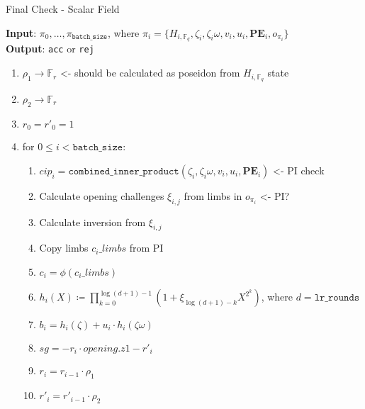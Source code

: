 \begin{algorithm}[H]
    \caption{Final Check - Scalar Field}
    \textbf{Input}: $\pi_0, \dots, \pi_{\texttt{batch\_size}}$, where $\pi_i = \{H_{i, \mathbb{F}_q}, \zeta_i, \zeta_i\omega, v_i, u_i,
    \textbf{PE}_i, o_{\pi_i} \}$ \\
    \textbf{Output}: \texttt{acc} or \texttt{rej}
    \begin{enumerate}
        \item $\rho_1 \rightarrow \mathbb{F}_r$ <- should be calculated as poseidon from $H_{i, \mathbb{F}_q}$ state
        \item $\rho_2 \rightarrow \mathbb{F}_r$
        \item $r_0 = r'_0 = 1$
        \item for $0 \leq i < \texttt{batch\_size}$:
        \begin{enumerate}
            \item $cip_i = \texttt{combined\_inner\_product}(\zeta_i, \zeta_i\omega, v_i, u_i, \textbf{PE}_i)$ <- PI check
            \item Calculate opening challenges $\xi_{i, j}$ from limbs in $o_{\pi_i}$ <- PI?
            \item Calculate inversion from $\xi_{i, j}$
			\item Copy limbs $c_i\_limbs$ from PI
            \item $c_i = \phi(c_i\_limbs)$
            \item $h_i(X) \coloneqq \prod_{k=0}^{\log(d+1) - 1}(1 + \xi_{\log(d+1)-k}X^{2^k})$, where $d = \texttt{lr\_rounds}$
            \item $b_i = h_i(\zeta) + u_i \cdot h_i(\zeta\omega)$
            \item $sg = -r_i \cdot opening.z1 - r'_i$
            \item $r_i = r_{i - 1} \cdot \rho_1$
            \item $r'_i = r'_{i - 1} \cdot \rho_2$
        \end{enumerate}
    \end{enumerate}
\end{algorithm}

